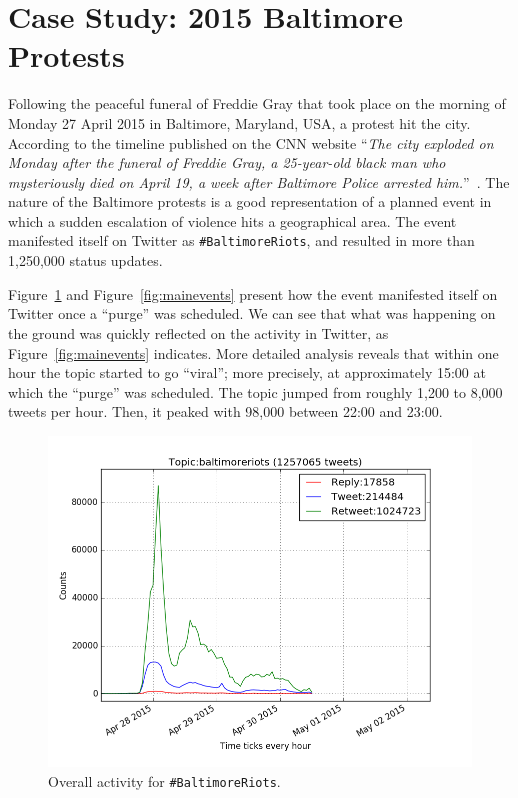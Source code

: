 \section{Case Study: 2015 Baltimore Protests}\label{baltimorecasestudy}

Following the peaceful funeral of Freddie Gray that took place on the
morning of Monday 27 April 2015 in Baltimore, Maryland, USA, a protest
hit the city. According to the timeline published on the CNN website
``{\emph{The city exploded on Monday after the funeral of Freddie
Gray, a 25-year-old black man who mysteriously died on April 19, a
week after Baltimore Police arrested
him.}}''~\cite{baltimorewiki:2015}. The nature of the Baltimore protests
is a good representation of a planned event in which a sudden
escalation of violence hits a geographical area. The event manifested
itself on Twitter as {\texttt{\#BaltimoreRiots}}, and resulted in more
than 1,250,000 status updates.

Figure~\ref{fig:overallbaltimoreactivity} and Figure~\ref{fig:mainevents}
present how the event manifested itself on Twitter once a ``purge'' was
scheduled. We can see that what was happening on the ground was
quickly reflected on the activity in Twitter, as
Figure~\ref{fig:mainevents} indicates. More detailed analysis reveals
that within one hour the topic started to go ``viral''; more
precisely, at approximately 15:00 at which the ``purge'' was
scheduled. The topic jumped from roughly 1,200 to 8,000 tweets per
hour. Then, it peaked with 98,000 between 22:00 and 23:00.

\begin{figure}[htb]
\centering
\includegraphics[width=\columnwidth]{images/overallbaltimoreactivity.png}
\caption{Overall activity for {\texttt{\#BaltimoreRiots}}.}
\label{fig:overallbaltimoreactivity}
\end{figure}

